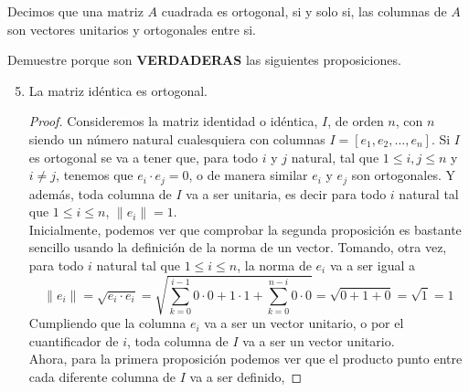 \begin{definition}
    Decimos que una matriz \(A\) cuadrada es ortogonal, si y solo si, las columnas de \(A\) son vectores unitarios y ortogonales entre si.
\end{definition}
\item Demuestre porque son \textbf{VERDADERAS} las siguientes proposiciones.
    \begin{enumerate}[label=\listAlph]
        \setcounter{enumii}{4}
        \item La matriz idéntica es ortogonal.
            \begin{proof}
                Consideremos la matriz identidad o idéntica, \(I\), de orden \(n\), con \(n\) siendo un número natural cualesquiera
                con columnas \(I = \left[e_1, e_2, \ldots, e_n\right]\).
                Si \(I\) es ortogonal se va a tener que, para todo \(i\) y \(j\) natural, tal que \(1 \leq i, j \leq n\) y \(i \neq j\), 
                tenemos que \(e_i \cdot e_j = 0\), o de manera similar \(e_i\) y \(e_j\) son ortogonales. Y además, toda columna de \(I\)
                va a ser unitaria, es decir para todo \(i\) natural tal que \(1 \leq i \leq n\), \(\|e_i\| = 1\).
                \\[0.25cm]
                Inicialmente, podemos ver que comprobar la segunda proposición es bastante sencillo usando la definición de la norma de un vector. 
                Tomando, otra vez, para todo \(i\) natural tal que \(1 \leq i \leq n\), la norma de \(e_i\) va a ser igual a
                \[
                    \|e_i\| 
                    = \sqrt{e_i \cdot e_i} 
                    = \sqrt{\sum_{k = 0}^{i - 1} 0 \cdot 0 + 1 \cdot 1 + \sum_{k = 0}^{n - i} 0 \cdot 0}
                    = \sqrt{0 + 1 + 0}
                    = \sqrt{1} 
                    = 1
                \]
                Cumpliendo que la columna \(e_i\) va a ser un vector unitario, o por el cuantificador de \(i\), toda columna de \(I\) va a ser un vector unitario.
                \\[0.25cm]
                Ahora, para la primera proposición podemos ver que el producto punto entre cada diferente columna de \(I\) va a ser definido,

\end{proof}
\end{enumerate}
